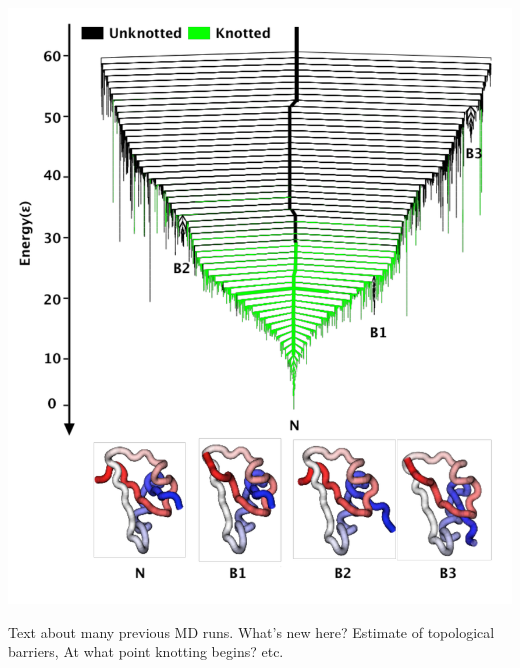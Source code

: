 \documentclass[a0paper,portrait]{baposter}
\begin{document}
\begin{poster}
{\begin{center}
\includegraphics[width=0.5\linewidth]{1mxi5_tree.pdf} 
\end{center}
Text about many previous MD runs. What's new here? Estimate of topological barriers, At what point knotting begins? etc. 
}











\end{poster}
\end{document}
